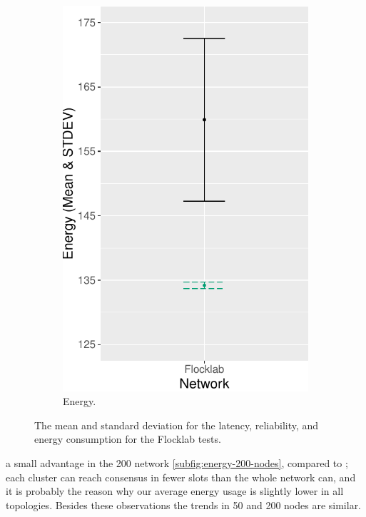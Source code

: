\begin{figure}[bt]
\begin{subfigure}{0.32\textwidth}
        \includegraphics[width=\textwidth, keepaspectratio]{figure/Results/ChaosComparison/Flocklab/FlocklabComparison_Energy.pdf}
        \caption{Energy.}
        \label{subfig:flocklab-energy}
    \end{subfigure}
    \caption{The mean and standard deviation for the latency, reliability, and energy consumption for the Flocklab tests.}
    \label{fig:flocklab-results}
\end{figure}

a small advantage in the 200 network \cref{subfig:energy-200-nodes}, compared to \atwo{}; each cluster can reach consensus in fewer slots than the whole network can, and it is probably the reason why our average energy usage is slightly lower in all topologies. Besides these observations the trends in 50 and 200 nodes are similar.



